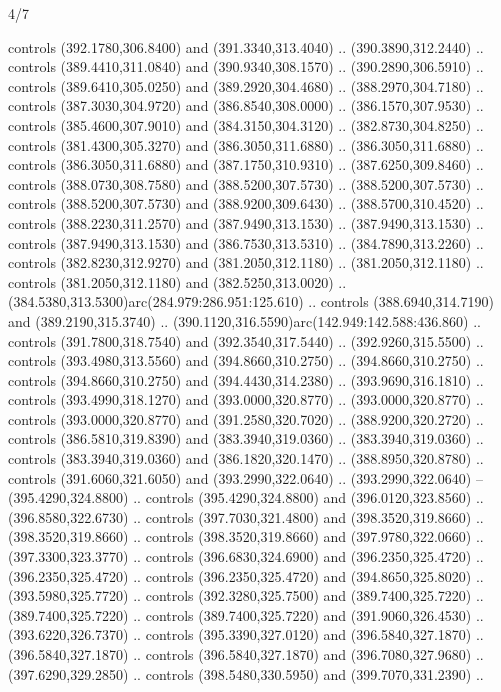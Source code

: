 \begin{flagdescription}{4/7}
\begin{scope}[shift={(0.5\flaglength,0.5\flagwidth)},scale=\flagwidth*\stretchfactor/820]
\begin{scope}[scale=1.87,xshift=-138mm,yshift=75mm]
\begin{scope}[y=0.8pt, x=0.8pt, yscale=-1, xscale=1]
\begin{scope}[fill=c9ca168]
  controls (392.1780,306.8400) and (391.3340,313.4040) .. (390.3890,312.2440) ..
  controls (389.4410,311.0840) and (390.9340,308.1570) .. (390.2890,306.5910) ..
  controls (389.6410,305.0250) and (389.2920,304.4680) .. (388.2970,304.7180) ..
  controls (387.3030,304.9720) and (386.8540,308.0000) .. (386.1570,307.9530) ..
  controls (385.4600,307.9010) and (384.3150,304.3120) .. (382.8730,304.8250) ..
  controls (381.4300,305.3270) and (386.3050,311.6880) .. (386.3050,311.6880) ..
  controls (386.3050,311.6880) and (387.1750,310.9310) .. (387.6250,309.8460) ..
  controls (388.0730,308.7580) and (388.5200,307.5730) .. (388.5200,307.5730) ..
  controls (388.5200,307.5730) and (388.9200,309.6430) .. (388.5700,310.4520) ..
  controls (388.2230,311.2570) and (387.9490,313.1530) .. (387.9490,313.1530) ..
  controls (387.9490,313.1530) and (386.7530,313.5310) .. (384.7890,313.2260) ..
  controls (382.8230,312.9270) and (381.2050,312.1180) .. (381.2050,312.1180) ..
  controls (381.2050,312.1180) and (382.5250,313.0020) ..
  (384.5380,313.5300)arc(284.979:286.951:125.610) .. controls
  (388.6940,314.7190) and (389.2190,315.3740) ..
  (390.1120,316.5590)arc(142.949:142.588:436.860) .. controls
  (391.7800,318.7540) and (392.3540,317.5440) .. (392.9260,315.5500) .. controls
  (393.4980,313.5560) and (394.8660,310.2750) .. (394.8660,310.2750) .. controls
  (394.8660,310.2750) and (394.4430,314.2380) .. (393.9690,316.1810) .. controls
  (393.4990,318.1270) and (393.0000,320.8770) .. (393.0000,320.8770) .. controls
  (393.0000,320.8770) and (391.2580,320.7020) .. (388.9200,320.2720) .. controls
  (386.5810,319.8390) and (383.3940,319.0360) .. (383.3940,319.0360) .. controls
  (383.3940,319.0360) and (386.1820,320.1470) .. (388.8950,320.8780) .. controls
  (391.6060,321.6050) and (393.2990,322.0640) .. (393.2990,322.0640) --
  (395.4290,324.8800) .. controls (395.4290,324.8800) and (396.0120,323.8560) ..
  (396.8580,322.6730) .. controls (397.7030,321.4800) and (398.3520,319.8660) ..
  (398.3520,319.8660) .. controls (398.3520,319.8660) and (397.9780,322.0660) ..
  (397.3300,323.3770) .. controls (396.6830,324.6900) and (396.2350,325.4720) ..
  (396.2350,325.4720) .. controls (396.2350,325.4720) and (394.8650,325.8020) ..
  (393.5980,325.7720) .. controls (392.3280,325.7500) and (389.7400,325.7220) ..
  (389.7400,325.7220) .. controls (389.7400,325.7220) and (391.9060,326.4530) ..
  (393.6220,326.7370) .. controls (395.3390,327.0120) and (396.5840,327.1870) ..
  (396.5840,327.1870) .. controls (396.5840,327.1870) and (396.7080,327.9680) ..
  (397.6290,329.2850) .. controls (398.5480,330.5950) and (399.7070,331.2390) ..

\end{scope}
\end{scope}
\end{scope}
\end{scope}
\end{flagdescription}
